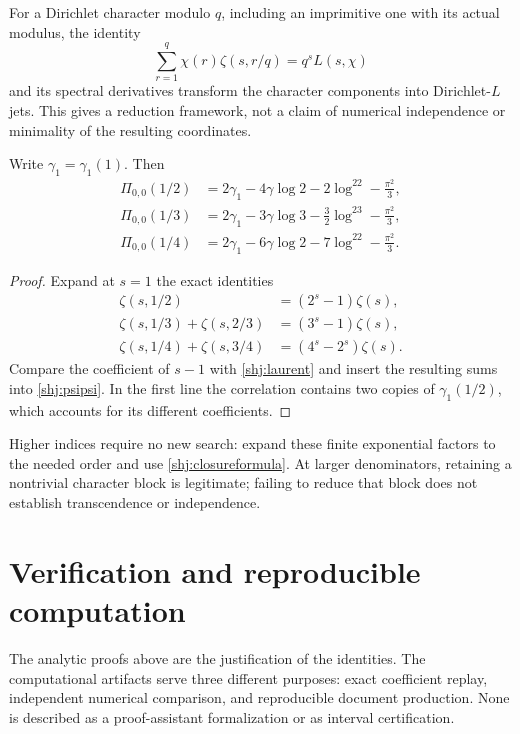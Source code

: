 For a Dirichlet character modulo $q$, including an imprimitive one with its actual modulus, the identity
\[
\sum_{r=1}^q\chi(r)\zeta(s,r/q)=q^sL(s,\chi)
\]
and its spectral derivatives transform the character components into Dirichlet-$L$ jets. This gives a reduction framework, not a claim of numerical independence or minimality of the resulting coordinates.

\begin{corollary}\label{shj:rationalpsi}
Write $\gamma_1=\gamma_1(1)$. Then
\begin{align}
\Pi_{0,0}(1/2)&=2\gamma_1-4\gamma\log2-2\log^22-\frac{\pi^2}{3},\label{shj:rathalf}\\
\Pi_{0,0}(1/3)&=2\gamma_1-3\gamma\log3-\frac32\log^23-\frac{\pi^2}{3},\label{shj:ratthird}\\
\Pi_{0,0}(1/4)&=2\gamma_1-6\gamma\log2-7\log^22-\frac{\pi^2}{3}.
\label{shj:ratquarter}
\end{align}
\end{corollary}
\begin{proof}
Expand at $s=1$ the exact identities
\begin{align*}
\zeta(s,1/2)&=(2^s-1)\zeta(s),\\
\zeta(s,1/3)+\zeta(s,2/3)&=(3^s-1)\zeta(s),\\
\zeta(s,1/4)+\zeta(s,3/4)&=(4^s-2^s)\zeta(s).
\end{align*}
Compare the coefficient of $s-1$ with \eqref{shj:laurent} and insert the resulting sums into \eqref{shj:psipsi}. In the first line the correlation contains two copies of $\gamma_1(1/2)$, which accounts for its different coefficients.
\end{proof}
Higher indices require no new search: expand these finite exponential factors to the needed order and use \eqref{shj:closureformula}. At larger denominators, retaining a nontrivial character block is legitimate; failing to reduce that block does not establish transcendence or independence.

\section{Verification and reproducible computation}\label{shj:verification}
The analytic proofs above are the justification of the identities. The computational artifacts serve three different purposes: exact coefficient replay, independent numerical comparison, and reproducible document production. None is described as a proof-assistant formalization or as interval certification.

